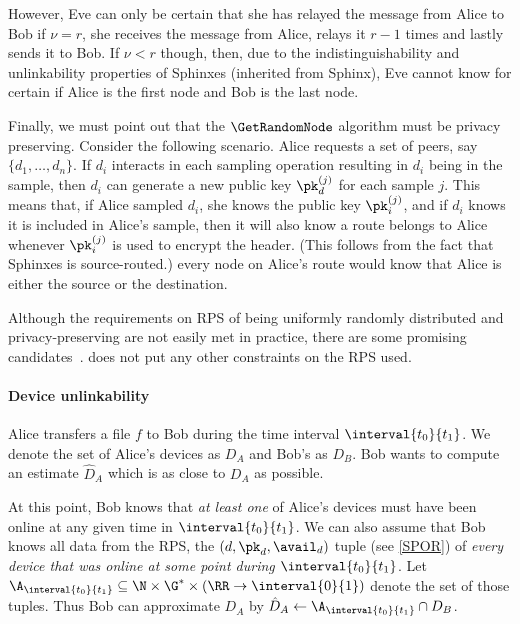 However, Eve can only be certain that she has relayed the message from Alice to 
Bob if \(\nu = r\), \ie she receives the message from Alice, relays it \(r-1\) 
times and lastly sends it to Bob.
If \(\nu < r\) though, then, due to the indistinguishability and unlinkability 
properties of Sphinxes (inherited from Sphinx), Eve cannot know for certain if 
Alice is the first node and Bob is the last node. 


Finally, we must point out that the \(\GetRandomNode\) algorithm must be 
privacy preserving.
Consider the following scenario.
Alice requests a set of peers, say \(\{d_1, \dotsc, d_n\}\).
If \(d_i\) interacts in each sampling operation resulting in \(d_i\) being in 
the sample, then \(d_i\) can generate a new public key \(\pk_d^{(j)}\) for each 
sample \(j\).
This means that, if Alice sampled \(d_i\), she knows the public key 
\(\pk_i^{(j)}\), and if \(d_i\) knows it is included in Alice's sample, then it 
will also know a route belongs to Alice whenever \(\pk_i^{(j)}\) is used to 
encrypt the header.
(This follows from the fact that Sphinxes is source-routed.)
\Ie every node on Alice's route would know that Alice is either the source or 
the destination.

Although the requirements on \ac{RPS} of being uniformly randomly
distributed and privacy-preserving are not easily met in practice,
there are some promising candidates~\cite{Octopus, BrahmsRPS}.\name
does not put any other constraints on the \ac{RPS} used.

\paragraph*{Device unlinkability}

Alice transfers a file \(f\) to Bob during the time interval 
\(\interval{t_0}{t_1}\).
We denote the set of Alice's devices as \(D_A\) and Bob's as \(D_B\).
Bob wants to compute an estimate \(\hat D_A\) which is as close to \(D_A\) as 
possible.

At this point, Bob knows that \emph{at least one} of Alice's devices must have 
been online at any given time in \(\interval{t_0}{t_1}\).
We can also assume that Bob knows all data from the \ac{RPS}, \ie the \((d, 
  \pk_d, \avail_d)\) tuple (see \cref{SPOR}) of \emph{every device that was 
  online at some point during \(\interval{t_0}{t_1}\)}.
Let \(\A_{\interval{t_0}{t_1}}\subseteq \N\times \G^*\times (\RR\to 
  \interval{0}{1})\) denote the set of those tuples.
Thus Bob can approximate \(D_A\) by \(\hat D_A \gets 
  \A_{\interval{t_0}{t_1}}\cap D_B\).

